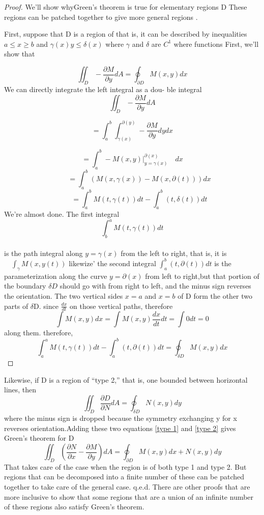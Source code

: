 \documentclass[10pt,a4paper]{article}
\newtheorem{proof}[theorem]{proof}
\begin{document}
\begin{proof}
We’ll show whyGreen’s theorem is true for elementary regions D These regions can be patched together to give more general regions \cite{ref1}.

First, suppose that D is a region of  that is, it can be described by inequalities ${a}\leq{x}\geq{b}$ and $\gamma\left(x\right){y}\leq\delta\left(x\right)$ where $\gamma$ and $\delta$ are $C^{1}$ where functions First, we’ll show that	
	
$$\iint_{D}-\frac{\partial M}{\partial y}dA=\oint_{\partial D}M\left(x,y\right)dx$$
We can directly integrate the left integral as a dou-
ble integral
$$\iint_{D}-\frac{\partial M}{\partial y}dA$$

$$=\int_{a}^{b}\int_{\gamma\left(x\right)}^{\partial \left(y\right)} -\frac{\partial M}{\partial y}dydx$$

$$=\int_{a}^{b}-M\left(x,y\right)\lvert_{y=\gamma\left(x\right)}^{\partial\left(x\right)}\quad dx$$
$$\quad\quad=\int_{a}^{b}\left(M\left(x,\gamma\left(x\right)\right)-M\left(x,\partial\left(t\right)\right)\right)dx$$
$$\quad\quad=\int_{a}^{b}M\left(t, \gamma\left(t\right)\right)dt-\int_{a}^{b}\left(t,\delta\left(t\right)\right)dt$$	
We’re almost done. The first integral
$$\int_{b}^{a}M\left(t,\gamma\left(t\right)\right)dt$$\\
is the path integral along $y=\gamma\left(x\right)$ from the left to right, that is, it is $\quad\int_{\gamma} 
M\left(x,y\left(t\right)\right)$ likewize' the second integral $\int_{a}^{b}\left(t,\partial\left(t\right)\right)dt$ is the parameterization along the curve $y=\partial\left(x\right)$ from left to right,but that 
portion of the boundary $\delta D$ should go with from right to left, and the minus sign reverses the 
orientation. The two vertical sides $x=a$ and $x=b$ of D form the other two parts of $\delta$D. since $\frac{dx}{dt}$  on those vertical paths, therefore\\
$$\int M\left(x,y\right)dx=\int M\left(x,y\right)\frac{dx}{dt}dt= \int0dt=0$$
along them. therefore,
$$\int_{a}^{a} M\left(t,\gamma\left(t\right)\right)dt-\int_{a}^{b}\left(t,\partial\left(t\right)\right)dt=\oint_{\delta D}M\left(x,y\right)dx$$\label{type 1}

\end{proof}
 

Likewise, if D is a region of “type 2,” that is, one bounded between horizontal lines, then\\
$$\iint_{D}\frac{\partial D}{\partial N} dA=\oint_{\delta D} N\left(x,y\right)dy$$\label{type 2}
where the minus sign is dropped because the symmetry exchanging y for x reverses orientation.Adding these two equations \ref{type 1} and \ref{type 2} gives Green’s theorem for D
$$\iint_{D}\left(\frac{\partial N}{\partial x}-\frac{\partial M}{\partial y}\right)dA=\oint_{\partial D}M\left(x,y\right)dx+ N\left(x,y\right)dy$$
That takes care of the case when the region is of
both type 1 and type 2. But regions that can be
decomposed into a finite number of these can be
patched together to take care of the general case.
q.e.d.\cite{ref1}
There are other proofs that are more inclusive
to show that some regions that are a union of an
infinite number of these regions also satisfy Green’s 
theorem.



\end{document}
